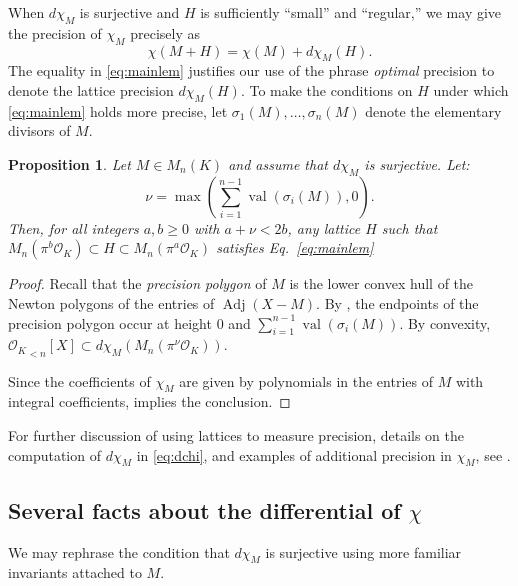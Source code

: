 \documentclass[sigconf]{acmart}
\DeclareMathOperator{\val}{val}
\DeclareMathOperator{\adj}{Adj}
\newcommand{\OK}{\mathcal{O}_K}
\newtheorem{prop}[theo]{Proposition}
\theoremstyle{definition}
\begin{document}
When $d\chi_M$ is surjective and $H$ is sufficiently ``small'' and ``regular,'' we may give
the precision of $\chi_M$ precisely as
\begin{equation} \label{eq:mainlem}
\chi(M + H) = \chi(M) + d\chi_M(H).
\end{equation}
The equality in \eqref{eq:mainlem} justifies our use of the phrase \emph{optimal} precision
to denote the lattice precision $d\chi_M(H)$. To make the conditions on $H$ under
which \eqref{eq:mainlem} holds more precise, let
$\sigma_1(M), \dots, \sigma_n(M)$ denote the elementary divisors of $M$.

\begin{prop} \label{prop:mainlem}
Let $M \in M_n(K)$ and assume that $d \chi_M$ is surjective. Let:
\[
\nu = \max\left(\sum_{i=1}^{n-1} \val(\sigma_i(M)), 0\right).
\]
Then, for all integers $a, b \geq 0$ with $a + \nu < 2b$,
any lattice $H$ such that $M_n(\pi^b \OK) \subset H \subset
M_n(\pi^a \OK)$
satisfies Eq.~\eqref{eq:mainlem}
\end{prop}

\begin{proof}
Recall \cite[Definition 3.3]{caruso-roe-vaccon:15a} that the \emph{precision polygon}
of $M$ is the lower convex hull of the Newton polygons of the entries of $\adj(X-M)$.
By \cite[Proposition 3.4]{caruso-roe-vaccon:15a}, the endpoints of the precision polygon
occur at height $0$ and $\sum_{i=1}^{n-1} \val(\sigma_i(M))$.  By convexity,
${\OK}_{<n}[X] \subset d\chi_M(M_n(\pi^\nu \OK))$.

Since the coefficients of $\chi_M$ are given by polynomials in the entries of $M$
with integral coefficients, \cite[Proposition 2.2]{caruso-roe-vaccon:15a} implies
the conclusion.
\end{proof}

For further discussion of using lattices to measure precision,
details on the computation of $d\chi_M$ in \eqref{eq:dchi}, and 
examples of additional precision in $\chi_M$,
see \cite[\S\S 2.4.3, 3.2.2]{caruso:17a}.

\subsection{Several facts about the differential of \texorpdfstring{$\chi$}{x}}

We may rephrase the condition that $d\chi_M$ is surjective using more familiar invariants attached to $M$.
\end{document}
